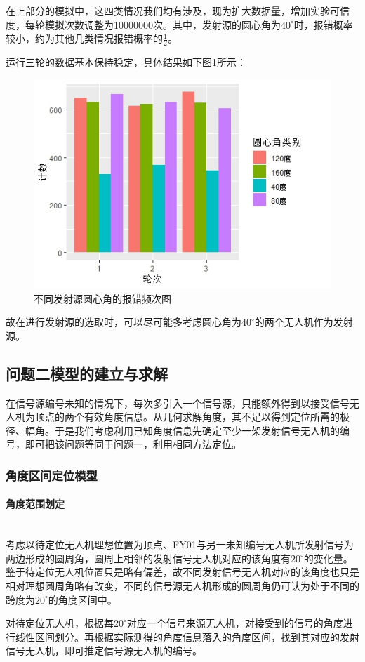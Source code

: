 \documentclass{ctexart}
\newcommand{\subsubsubsection}[1]{\paragraph{#1}\mbox{}\\}
\begin{document}
在上部分的模拟中，这四类情况我们均有涉及，现为扩大数据量，增加实验可信度，每轮模拟次数调整为10000000次。其中，发射源的圆心角为$40^{\circ}$时，报错概率较小，约为其他几类情况报错概率的$\frac{1}{2}$。

运行三轮的数据基本保持稳定，具体结果如下图\ref{不同发射源圆心角的报错频次图}所示：

\begin{figure}[H]
  \centering
  \includegraphics[width=0.55\linewidth]{pic/Rplot01.jpeg}
  \caption{不同发射源圆心角的报错频次图}
  \label{不同发射源圆心角的报错频次图}
  \end{figure}



故在进行发射源的选取时，可以尽可能多考虑圆心角为$40^{\circ}$的两个无人机作为发射源。


\subsection{问题二模型的建立与求解}

在信号源编号未知的情况下，每次多引入一个信号源，只能额外得到以接受信号无人机为顶点的两个有效角度信息。从几何求解角度，其不足以得到定位所需的极径、幅角。于是我们考虑利用已知角度信息先确定至少一架发射信号无人机的编号，即可把该问题等同于问题一，利用相同方法定位。

\subsubsection{角度区间定位模型}

\subsubsubsection{角度范围划定}
考虑以待定位无人机理想位置为顶点、FY01与另一未知编号无人机所发射信号为两边形成的圆周角，圆周上相邻的发射信号无人机对应的该角度有$20^{\circ}$的变化量。鉴于待定位无人机位置只是略有偏差，故不同发射信号无人机对应的该角度也只是相对理想圆周角略有改变，不同的信号源无人机形成的圆周角仍可认为处于不同的跨度为$20^{\circ}$的角度区间中。

对待定位无人机，根据每$20^{\circ}$对应一个信号来源无人机，对接受到的信号的角度进行线性区间划分。再根据实际测得的角度信息落入的角度区间，找到其对应的发射信号无人机，即可推定信号源无人机的编号。
\end{document}

